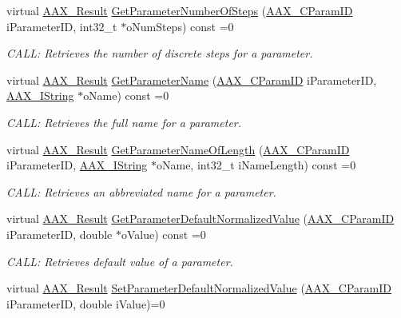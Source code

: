 \begin{Indent}
\begin{DoxyCompactItemize}
virtual \mbox{\hyperlink{a00392_a4d8f69a697df7f70c3a8e9b8ee130d2f}{A\+A\+X\+\_\+\+Result}} \mbox{\hyperlink{a01669_a2a8d8d200383204db9bb780a4cc8ef6f}{Get\+Parameter\+Number\+Of\+Steps}} (\mbox{\hyperlink{a00392_a1440c756fe5cb158b78193b2fc1780d1}{A\+A\+X\+\_\+\+C\+Param\+ID}} i\+Parameter\+ID, int32\+\_\+t $\ast$o\+Num\+Steps) const =0
\begin{DoxyCompactList}\small\item\em C\+A\+LL\+: Retrieves the number of discrete steps for a parameter. \end{DoxyCompactList}\item 
virtual \mbox{\hyperlink{a00392_a4d8f69a697df7f70c3a8e9b8ee130d2f}{A\+A\+X\+\_\+\+Result}} \mbox{\hyperlink{a01669_a8f8ae4b4346e708ec6de612ef99e5a92}{Get\+Parameter\+Name}} (\mbox{\hyperlink{a00392_a1440c756fe5cb158b78193b2fc1780d1}{A\+A\+X\+\_\+\+C\+Param\+ID}} i\+Parameter\+ID, \mbox{\hyperlink{a01873}{A\+A\+X\+\_\+\+I\+String}} $\ast$o\+Name) const =0
\begin{DoxyCompactList}\small\item\em C\+A\+LL\+: Retrieves the full name for a parameter. \end{DoxyCompactList}\item 
virtual \mbox{\hyperlink{a00392_a4d8f69a697df7f70c3a8e9b8ee130d2f}{A\+A\+X\+\_\+\+Result}} \mbox{\hyperlink{a01669_a5d556ae1fa4617a6439ef347139d70eb}{Get\+Parameter\+Name\+Of\+Length}} (\mbox{\hyperlink{a00392_a1440c756fe5cb158b78193b2fc1780d1}{A\+A\+X\+\_\+\+C\+Param\+ID}} i\+Parameter\+ID, \mbox{\hyperlink{a01873}{A\+A\+X\+\_\+\+I\+String}} $\ast$o\+Name, int32\+\_\+t i\+Name\+Length) const =0
\begin{DoxyCompactList}\small\item\em C\+A\+LL\+: Retrieves an abbreviated name for a parameter. \end{DoxyCompactList}\item 
virtual \mbox{\hyperlink{a00392_a4d8f69a697df7f70c3a8e9b8ee130d2f}{A\+A\+X\+\_\+\+Result}} \mbox{\hyperlink{a01669_a858f07ba021f8c9912bf91735b10314b}{Get\+Parameter\+Default\+Normalized\+Value}} (\mbox{\hyperlink{a00392_a1440c756fe5cb158b78193b2fc1780d1}{A\+A\+X\+\_\+\+C\+Param\+ID}} i\+Parameter\+ID, double $\ast$o\+Value) const =0
\begin{DoxyCompactList}\small\item\em C\+A\+LL\+: Retrieves default value of a parameter. \end{DoxyCompactList}\item 
virtual \mbox{\hyperlink{a00392_a4d8f69a697df7f70c3a8e9b8ee130d2f}{A\+A\+X\+\_\+\+Result}} \mbox{\hyperlink{a01669_a333b83bc6f37b0103ce0de65be02fede}{Set\+Parameter\+Default\+Normalized\+Value}} (\mbox{\hyperlink{a00392_a1440c756fe5cb158b78193b2fc1780d1}{A\+A\+X\+\_\+\+C\+Param\+ID}} i\+Parameter\+ID, double i\+Value)=0

\end{DoxyCompactItemize}
\end{Indent}
